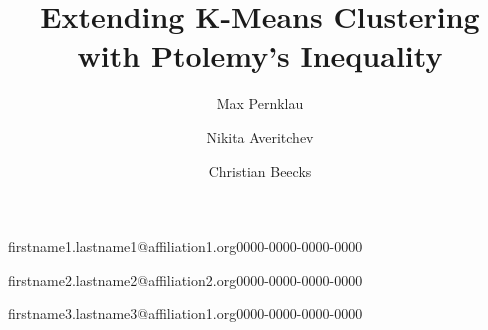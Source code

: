 







\title[Ein Kurztitel]{Extending K-Means Clustering with Ptolemy’s Inequality}
\author[1,2]{Max Pernklau}{firstname1.lastname1@affiliation1.org}{0000-0000-0000-0000}
\author[2]{Nikita Averitchev}{firstname2.lastname2@affiliation2.org}{0000-0000-0000-0000}
\author[3]{Christian Beecks}{firstname3.lastname3@affiliation1.org}{0000-0000-0000-0000}
\maketitle

